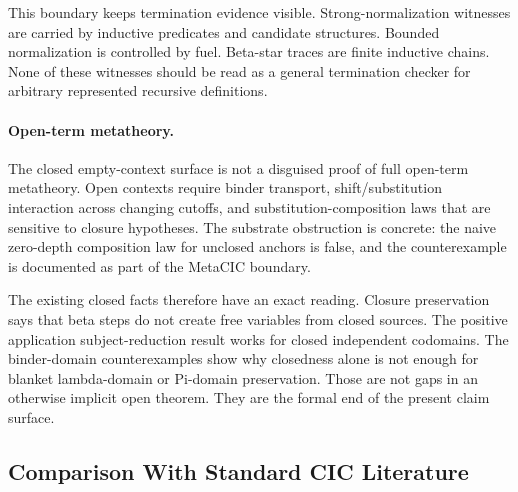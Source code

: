 This boundary keeps termination evidence visible.  Strong-normalization
witnesses are carried by inductive predicates and candidate structures.
Bounded normalization is controlled by fuel.  Beta-star traces are finite
inductive chains.  None of these witnesses should be read as a general
termination checker for arbitrary represented recursive definitions.

\paragraph{Open-term metatheory.}
The closed empty-context surface is not a disguised proof of full open-term
metatheory.  Open contexts require binder transport, shift/substitution
interaction across changing cutoffs, and substitution-composition laws that
are sensitive to closure hypotheses.  The substrate obstruction is concrete:
the naive zero-depth composition law for unclosed anchors is false, and the
counterexample is documented as part of the MetaCIC boundary.

The existing closed facts therefore have an exact reading.  Closure
preservation says that beta steps do not create free variables from closed
sources.  The positive application subject-reduction result works for closed
independent codomains.  The binder-domain counterexamples show why closedness
alone is not enough for blanket lambda-domain or Pi-domain preservation.
Those are not gaps in an otherwise implicit open theorem.  They are the
formal end of the present claim surface.

\subsection{Comparison With Standard CIC Literature}
\label{subsec:metacic-standard-cic-comparison}

